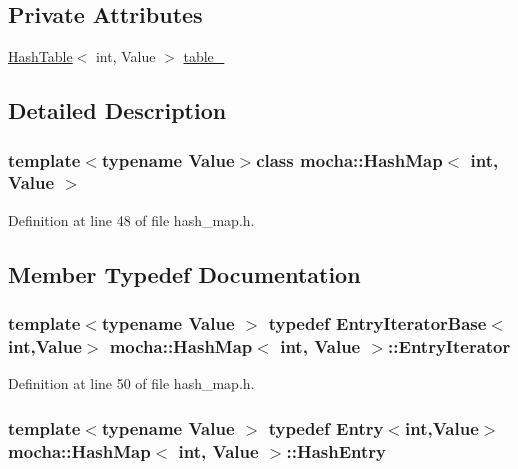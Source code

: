 \subsection*{Private Attributes}
\begin{DoxyCompactItemize}
\item 
\hyperlink{classmocha_1_1_hash_table}{HashTable}$<$ int, Value $>$ \hyperlink{classmocha_1_1_hash_map_3_01int_00_01_value_01_4_a271f8f89479a7186f854d8341647892a}{table\_\-}
\end{DoxyCompactItemize}


\subsection{Detailed Description}
\subsubsection*{template$<$typename Value$>$class mocha::HashMap$<$ int, Value $>$}



Definition at line 48 of file hash\_\-map.h.



\subsection{Member Typedef Documentation}
\hypertarget{classmocha_1_1_hash_map_3_01int_00_01_value_01_4_a9db157f397c8b5aa17afecf68c117d4b}{
\subsubsection[{EntryIterator}]{\setlength{\rightskip}{0pt plus 5cm}template$<$typename Value $>$ typedef {\bf EntryIteratorBase}$<$int,Value$>$ {\bf mocha::HashMap}$<$ int, Value $>$::{\bf EntryIterator}}}
\label{classmocha_1_1_hash_map_3_01int_00_01_value_01_4_a9db157f397c8b5aa17afecf68c117d4b}


Definition at line 50 of file hash\_\-map.h.

\hypertarget{classmocha_1_1_hash_map_3_01int_00_01_value_01_4_a4b5cb184c5d22d42fe7eb555d983ca56}{
\subsubsection[{HashEntry}]{\setlength{\rightskip}{0pt plus 5cm}template$<$typename Value $>$ typedef {\bf Entry}$<$int,Value$>$ {\bf mocha::HashMap}$<$ int, Value $>$::{\bf HashEntry}}}
\label{classmocha_1_1_hash_map_3_01int_00_01_value_01_4_a4b5cb184c5d22d42fe7eb555d983ca56}


